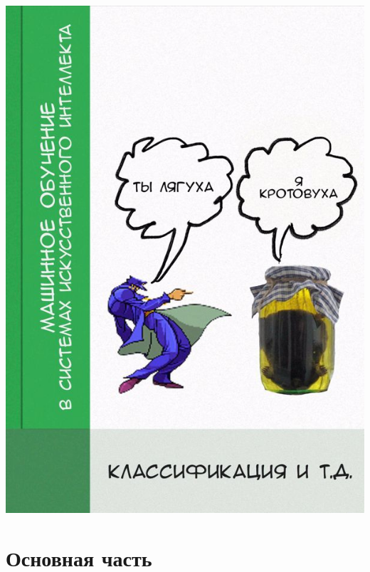 \documentclass[
    14pt,
    a4paper,
    oneside,
    openany,
    draft
]{extreport}
\begin{document}




\nocite{*}

\begin{titlepage}
    \includegraphics[]{figures/titlepage.jpg}
\end{titlepage}

\tableofcontents



\chapter{Основная часть}
\end{document}
